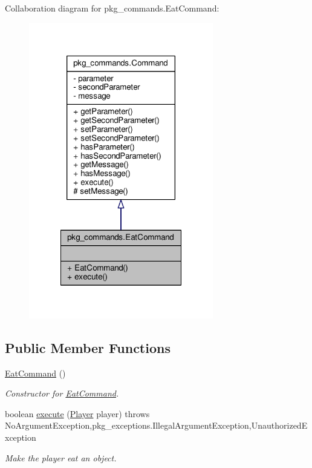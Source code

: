 Collaboration diagram for pkg\-\_\-commands.\-Eat\-Command\-:
\nopagebreak
\begin{figure}[H]
\begin{center}
\leavevmode
\includegraphics[width=228pt]{classpkg__commands_1_1EatCommand__coll__graph}
\end{center}
\end{figure}
\subsection*{Public Member Functions}
\begin{DoxyCompactItemize}
\item 
\hyperlink{classpkg__commands_1_1EatCommand_ad83dfae54a7d24140beff2b00201e065}{Eat\-Command} ()
\begin{DoxyCompactList}\small\item\em Constructor for \hyperlink{classpkg__commands_1_1EatCommand}{Eat\-Command}. \end{DoxyCompactList}\item 
boolean \hyperlink{classpkg__commands_1_1EatCommand_a2a600f09891aa076b3f630293de965f4}{execute} (\hyperlink{classpkg__world_1_1Player}{Player} player)  throws No\-Argument\-Exception,pkg\-\_\-exceptions.\-Illegal\-Argument\-Exception,\-Unauthorized\-Exception 
\begin{DoxyCompactList}\small\item\em Make the player eat an object. \end{DoxyCompactList}\end{DoxyCompactItemize}
